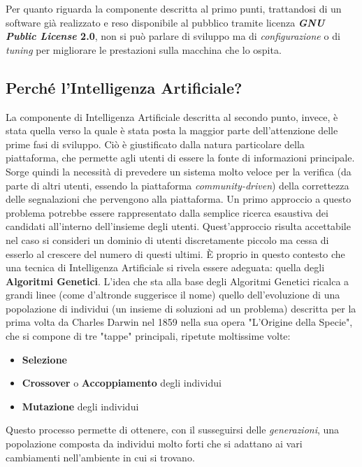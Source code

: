         Per quanto riguarda la componente descritta al primo punti, trattandosi di un software già realizzato e reso disponibile al pubblico tramite licenza \textbf{\textit{GNU Public License} 2.0}, non si può parlare di sviluppo ma di \textit{configurazione} o di \textit{tuning} per migliorare le prestazioni sulla macchina che lo ospita.

        \subsection{Perché l'Intelligenza Artificiale?}
            La componente di Intelligenza Artificiale descritta al secondo punto, invece, è stata quella verso la quale è stata posta la maggior parte dell'attenzione delle prime fasi di sviluppo. Ciò è giustificato dalla natura particolare della piattaforma, che permette agli utenti di essere la fonte di informazioni principale. Sorge quindi la necessità di prevedere un sistema molto veloce per la verifica (da parte di altri utenti, essendo la piattaforma \textit{community-driven}) della correttezza delle segnalazioni che pervengono alla piattaforma.  Un primo approccio a questo problema potrebbe essere rappresentato dalla semplice ricerca esaustiva dei candidati all'interno dell'insieme degli utenti. Quest'approccio risulta accettabile nel caso si consideri un dominio di utenti discretamente piccolo ma cessa di esserlo al crescere del numero di questi ultimi. È proprio in questo contesto che una tecnica di Intelligenza Artificiale si rivela essere adeguata: quella degli \textbf{Algoritmi Genetici}. L'idea che sta alla base degli Algoritmi Genetici ricalca a grandi linee (come d'altronde suggerisce il nome) quello dell'evoluzione di una popolazione di individui (un insieme di soluzioni ad un problema) descritta per la prima volta da Charles Darwin nel 1859 nella sua opera "L'Origine della Specie", che si compone di tre "tappe" principali, ripetute moltissime volte:

            \begin{itemize}
                \item \textbf{Selezione}
                \item \textbf{Crossover} o \textbf{Accoppiamento} degli individui 
                \item \textbf{Mutazione} degli individui 
            \end{itemize}

            Questo processo permette di ottenere, con il susseguirsi delle \textit{generazioni}, una popolazione composta da individui molto forti che si adattano ai vari cambiamenti nell'ambiente in cui si trovano.

